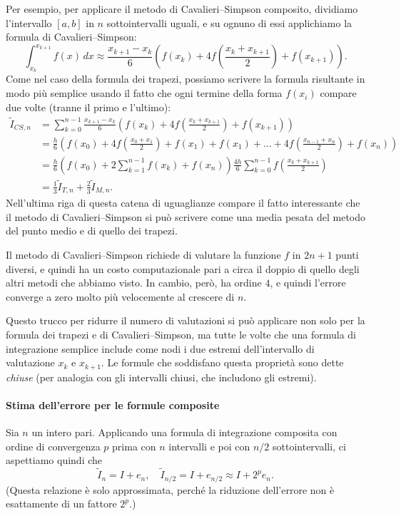 \documentclass[a4paper]{report}
\theoremstyle{definiton}
\theoremstyle{remark}
\begin{document}
Per esempio, per applicare il metodo di Cavalieri--Simpson composito, dividiamo l'intervallo $[a,b]$ in $n$ sottointervalli uguali, e su ognuno di essi applichiamo la formula di Cavalieri--Simpson:
\[
\int_{x_k}^{x_{k+1}} f(x) \, dx \approx \frac{x_{k+1}-x_k}{6}\left(f(x_k)+4f\left(\frac{x_k+x_{k+1}}{2}\right) + f(x_{k+1})\right).
\]
Come nel caso della formula dei trapezi, possiamo scrivere la formula risultante in modo più semplice usando il fatto che ogni termine della forma $f(x_i)$ compare due volte (tranne il primo e l'ultimo):
\begin{align*}
    \tilde{I}_{CS,n} &= \sum_{k=0}^{n-1} \frac{x_{k+1}-x_k}{6}\left(f(x_k)+4f\left(\frac{x_k+x_{k+1}}{2}\right) + f(x_{k+1})\right)\\
    &= \frac{h}{6} \left( f(x_0) + 4f\left(\frac{x_0+x_1}{2}\right) + f(x_1) + f(x_1) + \dots + 4f\left(\frac{x_{n-1}+x_n}{2}\right) +  f(x_n)   \right)\\
    &= \frac{h}{6} \left(f(x_0) + 2\sum_{k=1}^{n-1}f(x_k) + f(x_n) \right) \frac{4h}{6} \sum_{k=0}^{n-1} f\left(\frac{x_{k}+x_{k+1}}{2}\right) \\
    &= \frac13 \tilde{I}_{T,n} +\frac{2}{3}\tilde{I}_{M,n}.
\end{align*}
Nell'ultima riga di questa catena di uguaglianze compare il fatto interessante che il metodo di Cavalieri--Simpson si può scrivere come una media pesata del metodo del punto medio e di quello dei trapezi.

Il metodo di Cavalieri--Simpson richiede di valutare la funzione $f$ in $2n+1$ punti diversi, e quindi ha un costo computazionale pari a circa il doppio di quello degli altri metodi che abbiamo visto. In cambio, però, ha ordine $4$, e quindi l'errore converge a zero molto più velocemente al crescere di $n$.

Questo trucco per ridurre il numero di valutazioni si può applicare non solo per la formula dei trapezi e di Cavalieri--Simpson, ma tutte le volte che una formula di integrazione semplice include come nodi i due estremi dell'intervallo di valutazione $x_k$ e $x_{k+1}$. Le formule che soddisfano questa proprietà sono dette \emph{chiuse} (per analogia con gli intervalli chiusi, che includono gli estremi).

\paragraph{Stima dell'errore per le formule composite} Sia $n$ un intero pari. Applicando una formula di integrazione composita con ordine di convergenza $p$ prima con $n$ intervalli e poi con $n/2$ sottointervalli, ci aspettiamo quindi che
\[
    \tilde{I}_n = I + e_n, \quad \tilde{I}_{n/2} = I + e_{n/2} \approx I + 2^{p}e_n.
\]
(Questa relazione è solo approssimata, perché la riduzione dell'errore non è esattamente di un fattore $2^p$.)
\end{document}
